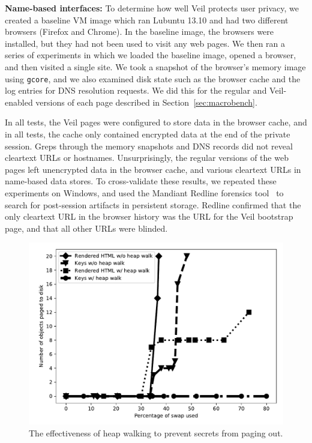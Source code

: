 {\bf Name-based interfaces:} To determine
how well Veil protects user privacy, we created
a baseline VM image which ran Lubuntu 13.10 and
had two different browsers (Firefox and Chrome). In
the baseline image, the browsers were installed, but they had
not been used to visit any web pages. We then ran
a series of experiments in which we loaded the
baseline image, opened a browser, and then visited
a single site. We took a snapshot of the browser's
memory image using \texttt{gcore}, and we also
examined disk state such as the browser
cache and the log entries for DNS resolution
requests. We did this for the regular and
Veil-enabled versions of each page described in
Section~\ref{sec:macrobench}.

In all tests, the Veil pages were configured to
store data in the browser cache, and in all tests,
the cache only contained encrypted data at the
end of the private session. Greps through the
memory snapshots and DNS records did not reveal
cleartext URLs or hostnames. Unsurprisingly,
the regular versions of the web pages left
unencrypted data in the browser cache, and
various cleartext URLs in name-based data
stores. To cross-validate these results, we
repeated these experiments on Windows, and used
the Mandiant Redline forensics tool~\cite{mandiant}
to search for post-session artifacts in persistent
storage. Redline confirmed that the only
cleartext URL in the browser history was the
URL for the Veil bootstrap page, and that all
other URLs were blinded.
\\

\begin{figure}
	\centering
	\includegraphics[width=\textwidth]{veil-figs/heapwalk_graph.pdf}
	\caption{The effectiveness of heap walking to prevent secrets from paging out.}
	\label{fig:heapWalking}
\end{figure}

